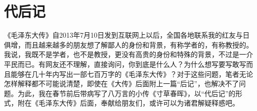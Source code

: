 \documentclass[../dazhuan.tex]{subfiles}
\begin{document}
\clearpage
\chapter*{代后记}

《毛泽东大传》自2013年7月10日发到互联网上以后，全国各地联系我的红友与日俱增，而且越来越多的朋友想了解鄙人的身份和背景，有称学者的，有称教授的。我说，我既不是学者，也不是教授，更没有高贵的身份和特殊的背景，不过是一介平民而已。有网友还不理解，直接询问，你到底是什么人？为什么想写要写敢写而且能够在几十年内写出一部七百万字的《毛泽东大传》？对于这些问题，笔者无论怎样解释都不可能说清楚，即使在《大传》后面附上一篇“后记”，也解决不了问题。为此，我在春节前后带病写了八万言的小传《寸草春晖》，以“代后记”的形式，附在《毛泽东大传》后面，奉献给朋友们，或许可以为诸君解疑释惑吧。
\end{document}
